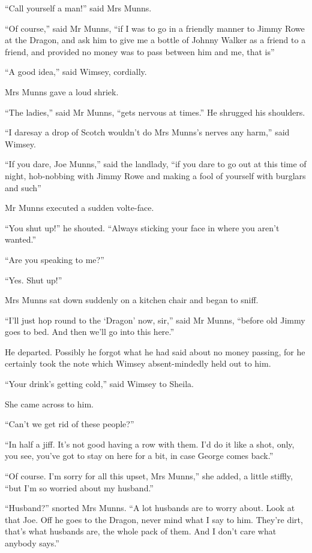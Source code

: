\enquote{Call yourself a man!} said Mrs Munns.

\enquote{Of course,} said Mr Munns, \enquote{if I was to go in a friendly manner to Jimmy Rowe at the Dragon, and ask him to give me a bottle of Johnny Walker as a friend to a friend, and provided no money was to pass between him and me, that is\longdash}

\enquote{A good idea,} said Wimsey, cordially.

Mrs Munns gave a loud shriek.

\enquote{The ladies,} said Mr Munns, \enquote{gets nervous at times.} He shrugged his shoulders.

\enquote{I daresay a drop of Scotch wouldn't do Mrs Munns's nerves any harm,} said Wimsey.

\enquote{If you dare, Joe Munns,} said the landlady, \enquote{if you dare to go out at this time of night, hob-nobbing with Jimmy Rowe and making a fool of yourself with burglars and such\longdash}

Mr Munns executed a sudden volte-face.

\enquote{You shut up!} he shouted. \enquote{Always sticking your face in where you aren't wanted.}

\enquote{Are you speaking to me?}

\enquote{Yes. Shut up!}

Mrs Munns sat down suddenly on a kitchen chair and began to sniff.

\enquote{I'll just hop round to the \enquote{Dragon} now, sir,} said Mr Munns, \enquote{before old Jimmy goes to bed. And then we'll go into this here.}

He departed. Possibly he forgot what he had said about no money passing, for he certainly took the note which Wimsey absent-mindedly held out to him.

\enquote{Your drink's getting cold,} said Wimsey to Sheila.

She came across to him.

\enquote{Can't we get rid of these people?}

\enquote{In half a jiff. It's not good having a row with them. I'd do it like a shot, only, you see, you've got to stay on here for a bit, in case George comes back.}

\enquote{Of course. I'm sorry for all this upset, Mrs Munns,} she added, a little stiffly, \enquote{but I'm so worried about my husband.}

\enquote{Husband?} snorted Mrs Munns. \enquote{A lot husbands are to worry about. Look at that Joe. Off he goes to the Dragon, never mind what I say to him. They're dirt, that's what husbands are, the whole pack of them. And I don't care what anybody says.}

